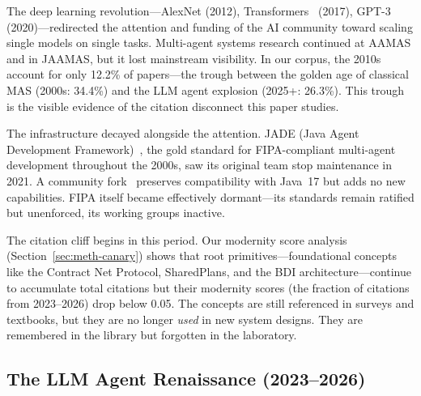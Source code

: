 \documentclass{article}
\begin{document}
%
%
%
%
%

The deep learning revolution---AlexNet (2012), Transformers~\citep{vaswani2017attention}
(2017), GPT-3~\citep{brown2020language} (2020)---redirected the attention and funding of
the AI community toward scaling single models on single tasks. Multi-agent systems
research continued at AAMAS and in JAAMAS, but it lost mainstream visibility. In our
corpus, the 2010s account for only 12.2\% of papers---the trough between the golden age
of classical MAS (2000s: 34.4\%) and the LLM agent explosion (2025+: 26.3\%). This
trough is the visible evidence of the citation disconnect this paper studies.

The infrastructure decayed alongside the attention. JADE (Java Agent Development
Framework)~\citep{bellifemine2007jade}, the gold standard for FIPA-compliant multi-agent
development throughout the 2000s, saw its original team stop maintenance in 2021. A
community fork~\citep{jadeplatform} preserves compatibility with Java~17 but adds no new
capabilities. FIPA itself became effectively dormant---its standards remain ratified but
unenforced, its working groups inactive.

The citation cliff begins in this period. Our modernity score analysis
(Section~\ref{sec:meth-canary}) shows that root primitives---foundational concepts like
the Contract Net Protocol, SharedPlans, and the BDI architecture---continue to accumulate
total citations but their modernity scores (the fraction of citations from 2023--2026)
drop below 0.05. The concepts are still referenced in surveys and textbooks, but they are
no longer \emph{used} in new system designs. They are remembered in the library but
forgotten in the laboratory.

\subsection{The LLM Agent Renaissance (2023--2026)}
\label{sec:bg-renaissance}
\end{document}

